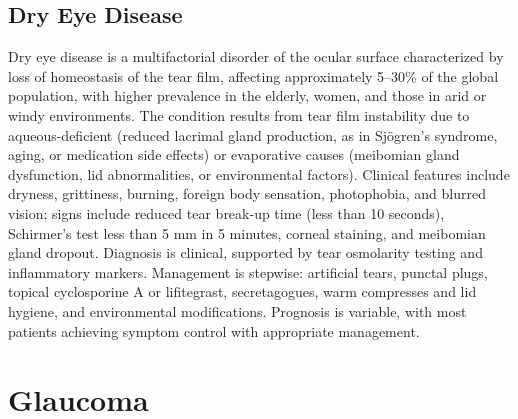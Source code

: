 






\label{sec:section:Dry Eye Disease}

\subsection{Dry Eye Disease}
\label{sec:Dry Eye Disease}
Dry eye disease is a multifactorial disorder of the ocular surface characterized by loss of homeostasis of the tear film, affecting approximately 5--30\% of the global population, with higher prevalence in the elderly, women, and those in arid or windy environments. The condition results from tear film instability due to aqueous-deficient (reduced lacrimal gland production, as in Sj\"{o}gren's syndrome, aging, or medication side effects) or evaporative causes (meibomian gland dysfunction, lid abnormalities, or environmental factors). Clinical features include dryness, grittiness, burning, foreign body sensation, photophobia, and blurred vision; signs include reduced tear break-up time (less than 10 seconds), Schirmer's test less than 5 mm in 5 minutes, corneal staining, and meibomian gland dropout. Diagnosis is clinical, supported by tear osmolarity testing and inflammatory markers. Management is stepwise: artificial tears, punctal plugs, topical cyclosporine A or lifitegrast, secretagogues, warm compresses and lid hygiene, and environmental modifications. Prognosis is variable, with most patients achieving symptom control with appropriate management.

\section{Glaucoma}

